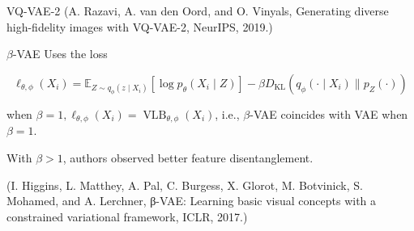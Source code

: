 \begin{frame}[allowframebreaks]
\begin{myconceptblock}{11.24}{VQ-VAE-2}
    (A. Razavi, A. van den Oord, and O. Vinyals, Generating diverse high-fidelity images with VQ-VAE-2, NeurIPS, 2019.)
\end{myconceptblock}

\end{frame}

\begin{frame}[allowframebreaks]

\begin{myconceptblock}{11.25}{$\beta$-VAE}
    Uses the loss

    $$
    \ell_{\theta, \phi}\left(X_{i}\right)=\mathbb{E}_{Z \sim q_{\phi}\left(z \mid X_{i}\right)}\left[\log p_{\theta}\left(X_{i} \mid Z\right)\right]-\beta D_{\mathrm{KL}}\left(q_{\phi}\left(\cdot \mid X_{i}\right) \| p_{Z}(\cdot)\right)
    $$

    when $\beta=1, \ell_{\theta, \phi}\left(X_{i}\right)=\operatorname{VLB}_{\theta, \phi}\left(X_{i}\right)$, i.e., $\beta$-VAE coincides with VAE when $\beta=1$.

    With $\beta>1$, authors observed better feature disentanglement.

    (I. Higgins, L. Matthey, A. Pal, C. Burgess, X. Glorot, M. Botvinick, S. Mohamed, and A. Lerchner, β-VAE: Learning basic visual concepts with a constrained variational framework, ICLR, 2017.)
\end{myconceptblock}

\end{frame}
